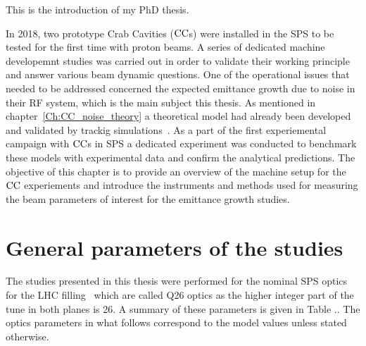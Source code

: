 This is the introduction of my PhD thesis.
\newpage

 In 2018, two prototype Crab Cavities (${\mathrm{CC}}$s) were installed in the SPS to be tested for the first time with proton beams. A series of dedicated machine developemnt studies was carried out in order to validate their working principle and answer various beam dynamic questions. One of the operational issues that needed to be addressed concerned the expected emittance growth due to noise in their RF system, which is the main subject this thesis.  As mentioned in chapter~\ref{Ch:CC_noise_theory} a theoretical model had already been developed and validated by trackig simulations~\cite{PhysRevSTAB.18.101001}. 
 As a part of the first experiemental campaign with ${\mathrm{CC}}$s in SPS a dedicated experiment was conducted to benchmark these models with experimental data and confirm the analytical predictions. The objective of this chapter is to provide an overview of the machine setup for the ${\mathrm{CC}}$ experiements and introduce the instruments and methods used for measuring the beam parameters of interest for the emittance growth studies.
 

 \section{General parameters of the studies}
 The studies presented in this thesis were performed for the nominal SPS optics for the LHC filling~\cite{SPS_optics_repo} which are called Q26 optics as the higher integer part of the tune in both planes is 26. A summary of these parameters is given in Table .. The optics parameters in what follows correspond to the model values unless stated otherwise.





 